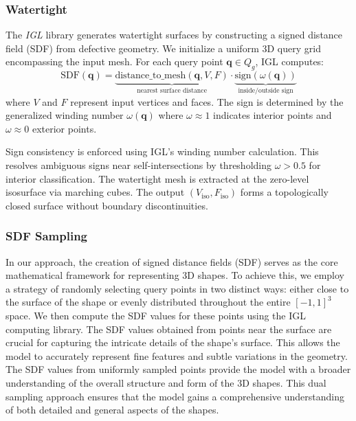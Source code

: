 \subsubsection{Watertight}
The \textit{IGL} library generates watertight surfaces by constructing a signed distance field (SDF) from defective geometry. We initialize a uniform 3D query grid encompassing the input mesh. For each query point $\mathbf{q} \in Q_g$, IGL computes:  
$$\text{SDF}(\mathbf{q}) = \underbrace{\text{distance\_to\_mesh}(\mathbf{q}, V, F)}_{\text{nearest surface distance}} \cdot \underbrace{\text{sign}(\omega(\mathbf{q}))}_{\text{inside/outside sign}}$$
where $V$ and $F$ represent input vertices and faces. The sign is determined by the generalized winding number $\omega(\mathbf{q})$ where $\omega \approx 1$ indicates interior points and $\omega \approx 0$ exterior points.  

Sign consistency is enforced using IGL's winding number calculation. This resolves ambiguous signs near self-intersections by thresholding $\omega > 0.5$ for interior classification. The watertight mesh is extracted at the zero-level isosurface via marching cubes. The output $(V_\text{iso}, F_\text{iso})$ forms a topologically closed surface without boundary discontinuities.

\subsubsection{SDF Sampling}
In our approach, the creation of signed distance fields (SDF) serves as the core mathematical framework for representing 3D shapes. To achieve this, we employ a strategy of randomly selecting query points in two distinct ways: either close to the surface of the shape or evenly distributed throughout the entire $[-1,1]^3$ space. We then compute the SDF values for these points using the IGL computing library. The SDF values obtained from points near the surface are crucial for capturing the intricate details of the shape's surface. This allows the model to accurately represent fine features and subtle variations in the geometry. The SDF values from uniformly sampled points provide the model with a broader understanding of the overall structure and form of the 3D shapes. This dual sampling approach ensures that the model gains a comprehensive understanding of both detailed and general aspects of the shapes.

